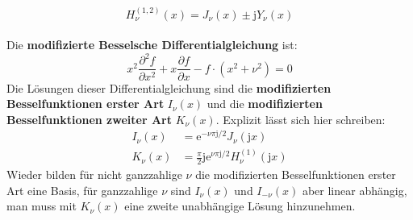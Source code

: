 \begin{equation}
	H_\nu^{(1,2)}(x) = J_\nu(x) \pm \mathrm{j} Y_\nu(x) 
\end{equation}\\
Die \textbf{modifizierte Besselsche Differentialgleichung} ist:
\begin{equation}
	x^2 \frac{\partial^2 f}{\partial x^2} + x \frac{\partial f}{\partial x} - f\cdot (x^2 + \nu^2) = 0
\end{equation}
Die Lösungen dieser Differentialgleichung sind die \textbf{modifizierten Besselfunktionen erster Art} $I_\nu(x)$ und die \textbf{modifizierten Besselfunktionen zweiter Art} $K_\nu(x)$. Explizit lässt sich hier schreiben:
\begin{equation}\begin{split}
	I_\nu(x) &= \mathrm{e}^{-\nu \pi \mathrm{j}/2} J_\nu(\mathrm{j}x) \\
	K_\nu(x) &= \frac{\pi}{2} \mathrm{j} \mathrm{e}^{\nu \pi \mathrm{j}/2} H_\nu^{(1)}(\mathrm{j}x)
	\end{split}\end{equation}
	Wieder bilden für nicht ganzzahlige $\nu$ die modifizierten Besselfunktionen erster Art eine Basis, für ganzzahlige $\nu$ sind $I_\nu(x)$ und $I_{-\nu}(x)$ aber linear abhängig, man muss mit $K_\nu(x)$ eine zweite unabhängige Lösung hinzunehmen.
